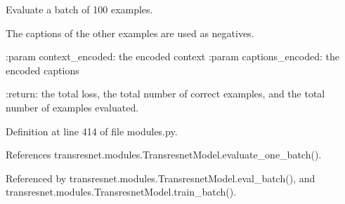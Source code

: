 \begin{DoxyVerb}Evaluate a batch of 100 examples.

The captions of the other examples are used as negatives.

:param context_encoded:
    the encoded context
:param captions_encoded:
    the encoded captions

:return:
    the total loss, the total number of correct examples, and the
    total number of examples evaluated.
\end{DoxyVerb}
 

Definition at line 414 of file modules.\+py.



References transresnet.\+modules.\+Transresnet\+Model.\+evaluate\+\_\+one\+\_\+batch().



Referenced by transresnet.\+modules.\+Transresnet\+Model.\+eval\+\_\+batch(), and transresnet.\+modules.\+Transresnet\+Model.\+train\+\_\+batch().

